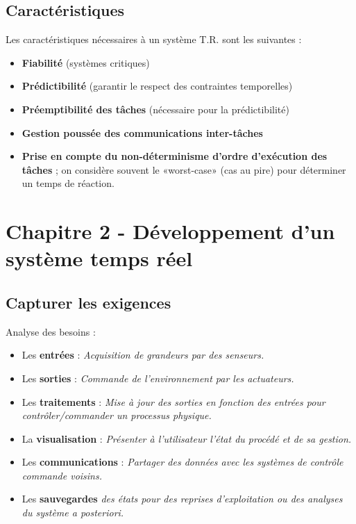 \documentclass{article}
\begin{document}
\subsection{Caractéristiques}

Les caractéristiques nécessaires à un système T.R. sont les suivantes : 
\begin{itemize}
\item \textbf{Fiabilité} (systèmes critiques)
\item \textbf{Prédictibilité} (garantir le respect des contraintes temporelles)
\item \textbf{Préemptibilité des tâches} (nécessaire pour la prédictibilité)
\item \textbf{Gestion poussée des communications inter-tâches}
\item \textbf{Prise en compte du non-déterminisme d’ordre d’exécution des tâches} ; on considère souvent le 
«worst-case» (cas au pire) pour déterminer un temps de réaction.
\end{itemize}

\section{Chapitre 2 - Développement d'un système temps réel}

\subsection{Capturer les exigences}

Analyse des besoins :
\begin{itemize}
\item Les \textbf{entrées} : \textit{Acquisition de grandeurs par des senseurs.}
\item Les \textbf{sorties} : \textit{Commande de l’environnement par les actuateurs.}
\item Les \textbf{traitements} : \textit{Mise à jour des sorties en fonction des entrées pour 
contrôler/commander un processus physique.}
\item La \textbf{visualisation} : \textit{Présenter à l’utilisateur l’état du procédé et de sa gestion.}
\item Les \textbf{communications} : \textit{Partager des données avec les systèmes de contrôle commande 
voisins.}
\item Les \textbf{sauvegardes} \textit{des états pour des reprises d’exploitation ou des analyses du système 
a posteriori.}
\end{itemize}
\end{document}
